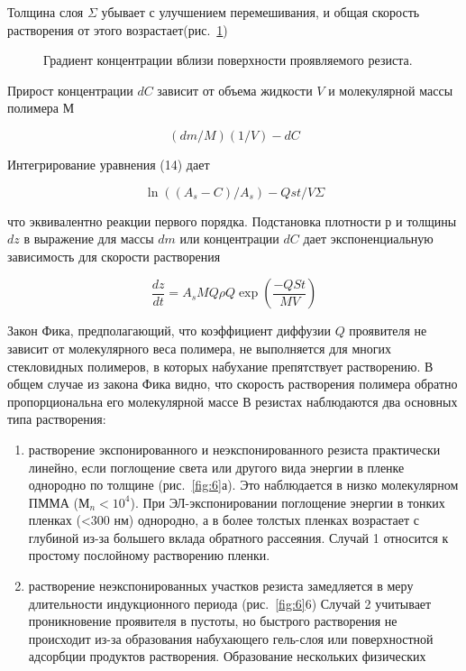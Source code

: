 Толщина слоя $\Sigma$ убывает с улучшением перемешивания, и общая скорость растворения от этого возрастает(рис.~\ref{fig:5})

\begin{figure}[H]
\center
\caption{Градиент концентрации вблизи поверхности проявляемого резиста.}
\label{fig:5}
\end{figure}

Прирост концентрации $dC$ зависит от объема жидкости $V$ и молекулярной массы полимера $М$

\begin{equation}
(dm/M)(1/V)-dC
\label{eq:A15}
\end{equation}

Интегрирование уравнения (14) дает

\begin{equation}
\ln((A_s-C)/A_s) -Qst/V\Sigma
\label{eq:A16}
\end{equation}

что эквивалентно реакции первого порядка. Подстановка плотности $р$ и толщины $dz$ в выражение для массы $dm$ или концентрации $dC$ дает экспоненциальную зависимость для скорости растворения

\begin{equation}
\frac{dz}{dt} = A_s MQ \rho Q \exp\left(\frac{-QSt}{MV}\right)
\label{eq:A17}
\end{equation}

Закон Фика, предполагающий, что коэффициент диффузии $Q$ проявителя не зависит от молекулярного веса полимера, не выполняется для многих стекловидных полимеров, в которых набухание препятствует растворению.
В общем случае из закона Фика видно, что скорость растворения полимера обратно пропорциональна его молекулярной массе В резистах наблюдаются два основных типа растворения:
\begin{enumerate}
    \item растворение экспонированного и неэкспонированного резиста практически линейно, если поглощение света или другого вида энергии в пленке однородно по толщине (рис.~\ref{fig:6}а). Это наблюдается в низко молекулярном ПММА ($М_n<10^4$). При ЭЛ-экспонировании поглощение энергии в тонких пленках (<300 нм) однородно, а в более толстых пленках возрастает с глубиной из-за большего вклада обратного рассеяния. Случай 1 относится к простому послойному растворению пленки.
    \item растворение неэкспонированных участков резиста замедляется в меру длительности индукционного периода (рис.~\ref{fig:6}6)  Случай 2 учитывает проникновение проявителя в пустоты, но быстрого растворения не происходит из-за образования набухающего гель-слоя или поверхностной адсорбции продуктов растворения. Образование нескольких физических
\end{enumerate}

